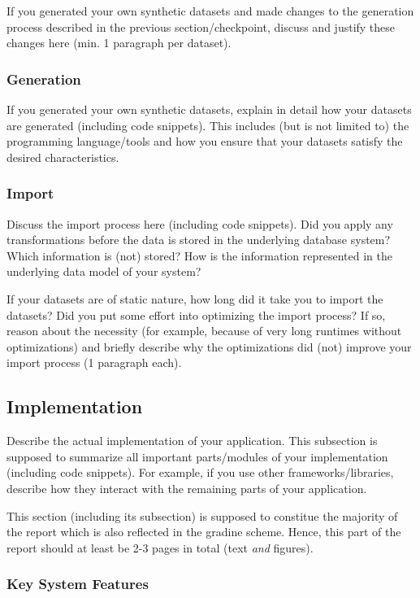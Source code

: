If you generated your own synthetic datasets and made changes to the generation
process described in the previous section/checkpoint, discuss and justify these
changes here (min. 1 paragraph per dataset).

\subsubsection{Generation}

If you generated your own synthetic datasets, explain in detail how your
datasets are generated (including code snippets). This includes (but is not
limited to) the programming language/tools and how you ensure that your datasets
satisfy the desired characteristics.

\subsubsection{Import}

Discuss the import process here (including code snippets). Did you apply any
transformations before the data is stored in the underlying database system?
Which information is (not) stored? How is the information represented in the
underlying data model of your system?

If your datasets are of static nature, how long did it take you to import the
datasets? Did you put some effort into optimizing the import process? If so,
reason about the necessity (for example, because of very long runtimes without
optimizations) and briefly describe why the optimizations did (not) improve your
import process (1 paragraph each).

\subsection{Implementation}

Describe the actual implementation of your application. This subsection is
supposed to summarize all important parts/modules of your implementation
(including code snippets). For example, if you use other frameworks/libraries,
describe how they interact with the remaining parts of your application.

This section (including its subsection) is supposed to constitue the majority
of the report which is also reflected in the gradine scheme. Hence, this part of
the report should at least be 2-3 pages in total (text \emph{and} figures).

\subsubsection{Key System Features}

